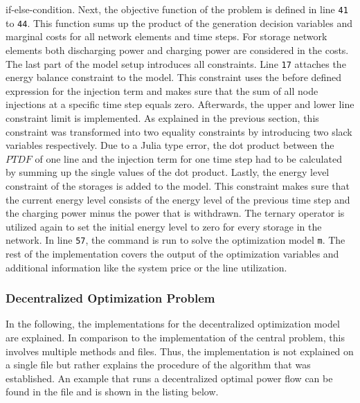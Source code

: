 if-else-condition. Next, the objective function of the problem is defined in line \texttt{41} to \texttt{44}. This function sums up the product of the generation decision variables and marginal costs for all network elements and time steps. For storage network elements both discharging power and charging power are considered in the costs. The last part of the model setup introduces all constraints. Line \texttt{17} attaches the energy balance constraint to the model. This constraint uses the before defined expression for the injection term and makes sure that the sum of all node injections at a specific time step equals zero. Afterwards, the upper and lower line constraint limit is implemented. As explained in the previous section, this constraint was transformed into two equality constraints by introducing two slack variables respectively. Due to a Julia type error, the dot product between the $PTDF$ of one line and the injection term for one time step had to be calculated by summing up the single values of the dot product. Lastly, the energy level constraint of the storages is added to the model. This constraint makes sure that the current energy level consists of the energy level of the previous time step and the charging power minus the power that is withdrawn. The ternary operator is utilized again to set the initial energy level to zero for every storage in the network. In line \texttt{57}, the command is run to solve the optimization model \lstinline[language=julia]{m}. The rest of the implementation covers the output of the optimization variables and additional information like the system price or the line utilization.


\subsubsection{Decentralized Optimization Problem}

In the following, the implementations for the decentralized optimization model are explained. In comparison to the implementation of the central problem, this involves multiple methods and files. Thus, the implementation is not explained on a single file but rather explains the procedure of the algorithm that was established. An example that runs a decentralized optimal power flow can be found in the file  and is shown in the listing below.



